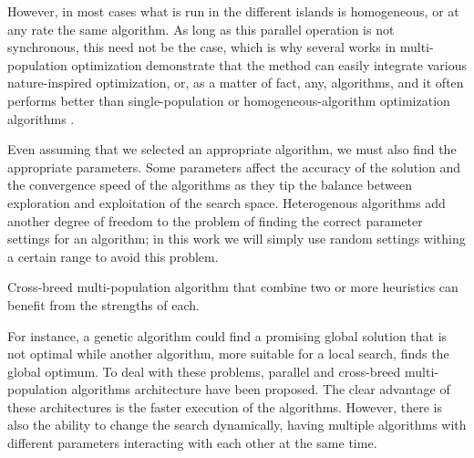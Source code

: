 \documentclass[runningheads]{llncs}
\begin{document}
However, in most cases what is run in the different islands is
homogeneous, or at any rate the same algorithm. As long as this
parallel operation is not synchronous, this need not be the case,
which is why several works in multi-population
optimization demonstrate that the method can easily
integrate various nature-inspired optimization, or, as a matter of
fact, any, algorithms, and it often performs
better than single-population  or homogeneous-algorithm optimization algorithms 
\cite{wu2016differential,nseef2016adaptive}.

Even assuming that we selected an appropriate algorithm, we must also find the
appropriate parameters.  Some parameters affect the accuracy of the solution and
the convergence speed of the algorithms as they tip the balance between exploration
and exploitation of the search space. Heterogenous algorithms add
another degree of freedom to the problem of finding the correct
parameter settings for an algorithm; in this work we will simply use
random settings withing a certain range to avoid this problem.


Cross-breed multi-population algorithm that combine two or more
heuristics can benefit from the strengths of each. %

For instance, a genetic
algorithm could find a promising global solution that is not optimal while another algorithm, more
suitable for a local search, finds the global optimum. To deal with these problems,
parallel and cross-breed multi-population algorithms architecture have been proposed. %
The clear advantage of
these architectures is the faster execution of the algorithms. However, there is
also the ability to change the search dynamically, %
having multiple algorithms
with different parameters interacting with each other at the same
time. %
\end{document}
